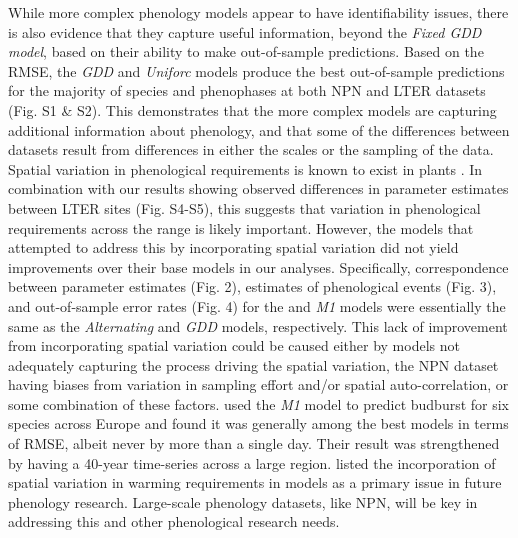 \documentclass[fleqn,12pt,lineno]{article}
\begin{document}
While more complex phenology models appear to have identifiability issues, there is also evidence that they capture useful information, beyond the \textit{Fixed GDD model}, based on their ability to make out-of-sample predictions. Based on the RMSE, the \textit{GDD} and \textit{Uniforc} models produce the best out-of-sample predictions for the majority of species and phenophases at both NPN and LTER datasets (Fig. S1 \& S2). This demonstrates that the more complex models are capturing additional information about phenology, and that some of the differences between datasets result from differences in either the scales or the sampling of the data. Spatial variation in phenological requirements is known to exist in plants \citep{zhang2017}. In combination with our results showing observed differences in parameter estimates between LTER sites (Fig. S4-S5), this suggests that variation in phenological requirements across the range is likely important. However, the models that attempted to address this by incorporating spatial variation did not yield improvements over their base models in our analyses. Specifically, correspondence between parameter estimates (Fig. 2), estimates of phenological events (Fig. 3), and out-of-sample error rates (Fig. 4) for the  and \textit{M1} models were essentially the same as the \textit{Alternating} and \textit{GDD} models, respectively. This lack of improvement from incorporating spatial variation could be caused either by models not adequately capturing the process driving the spatial variation, the NPN dataset having biases from variation in sampling effort and/or spatial auto-correlation, or some combination of these factors. \cite{basler2016} used the \textit{M1} model to predict budburst for six species across Europe and found it was generally among the best models in terms of RMSE, albeit never by more than a single day. Their result was strengthened by having a 40-year time-series across a large region. \cite{chuine2017} listed the incorporation of spatial variation in warming requirements in models as a primary issue in future phenology research. Large-scale phenology datasets, like NPN, will be key in addressing this and other phenological research needs.
\end{document}
